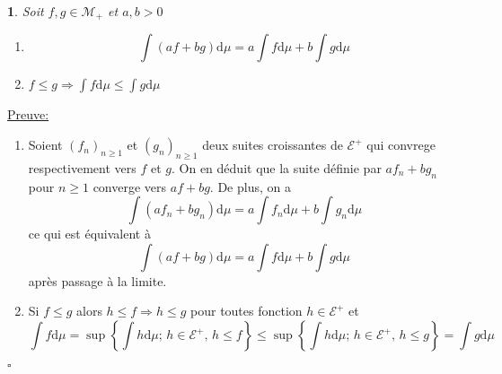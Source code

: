 \documentclass[8pt,notheorems]{beamer}
\newtheorem{prop}{\translate{Proposition}}
\theoremstyle{definition}
\theoremstyle{example}
\theoremstyle{mystyle}
\theoremstyle{plain}
\begin{document}
\begin{frame}[allowframebreaks]
\begin{prop}\label{prop:IntegralProperties}
Soit $f,g\in\mathcal{M}_{+}$ et $a, b>0$
\begin{enumerate}
    \item
    $$
    \int (af+ bg)\text{d}\mu = a\int f\text{d}\mu + b\int g\text{d}\mu 
    $$ 
    \item $f\leq g \Rightarrow  \int f \text{d}\mu\leq \int g\text{d}\mu$
\end{enumerate}
\end{prop}
\underline{Preuve:}\\
\begin{enumerate}
    \item Soient $(f_n)_{n\geq 1}$ et $(g_n)_{n\geq 1}$ deux suites croissantes de $\mathcal{E}^+$ qui convrege respectivement vers $f$ et $g$. On en déduit que la suite définie par $af_n+bg_n$ pour $n\geq1$ converge vers $af+bg$. De plus, on a 
    $$
    \int (af_n+bg_n)\text{d}\mu = a\int f_n\text{d}\mu +b\int g_n\text{d}\mu 
    $$
    ce qui est équivalent à 
    $$
    \int (af+bg)\text{d}\mu = a\int f\text{d}\mu+b\int g\text{d}\mu
    $$
    après passage à la limite. 
    \item Si $f\leq g$ alors $h\leq f\Rightarrow h\leq g$ pour toutes fonction $h\in \mathcal{E}^+$ et 
    $$
    \int f\text{d}\mu=\sup\left\{\int h\text{d}\mu\text{; }h\in \mathcal{E}^+,\, h\leq f\right\}\leq \sup\left\{\int h\text{d}\mu\text{; }h\in \mathcal{E}^+,\, h\leq g\right\} = \int g\text{d}\mu 
    $$
     
\end{enumerate}
$\square$
\end{frame}
\end{document}
